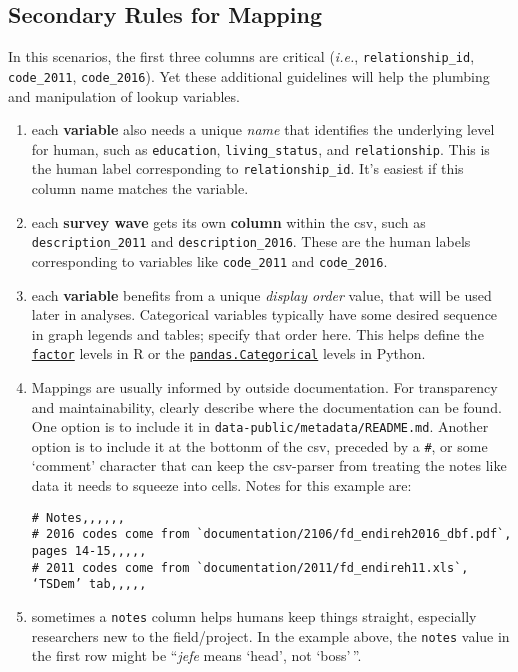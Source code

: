 \documentclass[
]{book}
\begin{document}
\hypertarget{secondary-rules-for-mapping}{%
\subsection{Secondary Rules for Mapping}\label{secondary-rules-for-mapping}}

In this scenarios, the first three columns are critical (\emph{i.e.}, \texttt{relationship\_id}, \texttt{code\_2011}, \texttt{code\_2016}). Yet these additional guidelines will help the plumbing and manipulation of lookup variables.

\begin{enumerate}
\def\labelenumi{\arabic{enumi}.}
\item
  each \textbf{variable} also needs a unique \emph{name} that identifies the underlying level for human, such as \texttt{education}, \texttt{living\_status}, and \texttt{relationship}. This is the human label corresponding to \texttt{relationship\_id}. It's easiest if this column name matches the variable.
\item
  each \textbf{survey wave} gets its own \textbf{column} within the csv, such as \texttt{description\_2011} and \texttt{description\_2016}. These are the human labels corresponding to variables like \texttt{code\_2011} and \texttt{code\_2016}.
\item
  each \textbf{variable} benefits from a unique \emph{display order} value, that will be used later in analyses. Categorical variables typically have some desired sequence in graph legends and tables; specify that order here. This helps define the \href{https://stat.ethz.ch/R-manual/R-devel/library/base/html/factor.html}{\texttt{factor}} levels in R or the \href{https://pandas.pydata.org/pandas-docs/stable/reference/api/pandas.Categorical.html\#pandas.Categorical}{\texttt{pandas.Categorical}} levels in Python.
\item
  Mappings are usually informed by outside documentation. For transparency and maintainability, clearly describe where the documentation can be found. One option is to include it in \texttt{data-public/metadata/README.md}. Another option is to include it at the bottonm of the csv, preceded by a \texttt{\#}, or some `comment' character that can keep the csv-parser from treating the notes like data it needs to squeeze into cells. Notes for this example are:

\begin{verbatim}
# Notes,,,,,,
# 2016 codes come from `documentation/2106/fd_endireh2016_dbf.pdf`, pages 14-15,,,,,
# 2011 codes come from `documentation/2011/fd_endireh11.xls`, ‘TSDem’ tab,,,,,
\end{verbatim}
\item
  sometimes a \texttt{notes} column helps humans keep things straight, especially researchers new to the field/project. In the example above, the \texttt{notes} value in the first row might be ``\emph{jefe} means `head', not `boss'\,''.
\end{enumerate}
\end{document}

